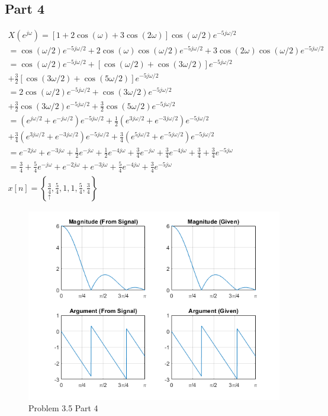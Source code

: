 \documentclass{article}
\begin{document}
\subsection*{Part 4}
\begin{gather*}
    X\left(e^{j\omega}\right) = \left[1 + 2\cos(\omega) + 3\cos(2\omega)\right]\cos(\omega/2)e^{-5j\omega/2}\\
    = \cos(\omega/2)e^{-5j\omega/2} + 2\cos(\omega)\cos(\omega/2)e^{-5j\omega/2} + 3\cos(2\omega)\cos(\omega/2)e^{-5j\omega/2}\\
    = \cos(\omega/2)e^{-5j\omega/2} + \left[ \cos(\omega/2) + \cos(3\omega/2) \right]e^{-5j\omega/2}\\ + \frac32\left[\cos(3\omega/2) + \cos(5\omega/2)\right]e^{-5j\omega/2}\\
    = 2\cos(\omega/2)e^{-5j\omega/2} + \cos(3\omega/2)e^{-5j\omega/2}\\ + \frac32 \cos(3\omega/2)e^{-5j\omega/2} + \frac32 \cos(5\omega/2)e^{-5j\omega/2}\\
    = \left(e^{j\omega/2} + e^{-j\omega/2}\right)e^{-5j\omega/2} + \frac12\left(e^{3j\omega/2} + e^{-3j\omega/2}\right)e^{-5j\omega/2}\\ + \frac34\left(e^{3j\omega/2} + e^{-3j\omega/2}\right)e^{-5j\omega/2} + \frac34\left(e^{5j\omega/2} + e^{-5j\omega/2}\right)e^{-5j\omega/2}\\
    = e^{-2j\omega} + e^{-3j\omega} + \frac12 e^{-j\omega} + \frac12 e^{-4j\omega} + \frac34 e^{-j\omega} + \frac34 e^{-4j\omega} + \frac34 + \frac34 e^{-5j\omega}\\
    = \frac34 + \frac54e^{-j\omega} + e^{-2j\omega} + e^{-3j\omega} + \frac54 e^{-4j\omega} + \frac34 e^{-5j\omega}\\
    x[n] = \left\{\underset{\uparrow}{\frac34}, \frac54, 1, 1, \frac54, \frac34\right\}
\end{gather*}
\begin{figure}[H]
    \centering
    \includegraphics[width=\textwidth]{html/Homework3_15.png}
    \caption{Problem 3.5 Part 4}
    \label{3.5.4}
\end{figure}
\end{document}
